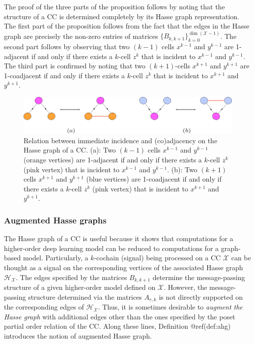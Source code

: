 \documentclass[
  12pt,
]{krantz}
\begin{document}
The proof of the three parts of the proposition follows by noting that
the structure of a CC is determined completely by its Hasse graph
representation. The first part of the proposition follows from the fact
that the edges in the Hasse graph are precisely the non-zero entries of
matrices \(\{B_{k,k+1}\}_{k=0}^{\dim(\mathcal{X}-1)}\). The second part
follows by observing that two \((k-1)\) cells \(x^{k-1}\) and
\(y^{k-1}\) are 1-adjacent if and only if there exists a \(k\)-cell
\(z^k\) that is incident to \(x^{k-1}\) and \(y^{k-1}\). The third part
is confirmed by noting that two \((k+1)\)-cells \(x^{k+1}\) and
\(y^{k+1}\) are 1-coadjacent if and only if there exists a \(k\)-cell
\(z^k\) that is incident to \(x^{k+1}\) and \(y^{k+1}\).

\begin{figure}

{\centering \includegraphics{figures/prop_structure} 

}

\caption{Relation between immediate incidence and (co)adjacency on the Hasse graph of a CC. (a): Two $(k-1)$ cells $x^{k-1}$ and $y^{k-1}$ (orange vertices) are 1-adjacent if and only if there exists a $k$-cell $z^k$ (pink vertex) that is incident to $x^{k-1}$ and $y^{k-1}$. (b): Two $(k+1)$ cells $x^{k+1}$ and $y^{k+1}$ (blue vertices) are 1-coadjacent if and only if there exists a $k$-cell $z^k$ (pink vertex) that is incident to $x^{k+1}$ and $y^{k+1}$.}\label{fig:vis-structure}
\end{figure}

\subsubsection{Augmented Hasse graphs}\label{augmented-hasse-graphs}

The Hasse graph of a CC is useful because it shows that computations for
a higher-order deep learning model can be reduced to computations for a
graph-based model. Particularly, a \(k\)-cochain (signal) being
processed on a CC \(\mathcal{X}\) can be thought as a signal on the
corresponding vertices of the associated Hasse graph
\(\mathcal{H}_{\mathcal{X}}\). The edges specified by the matrices
\(B_{k,k+1}\) determine the message-passing structure of a given
higher-order model defined on \(\mathcal{X}\). However, the
message-passing structure determined via the matrices \(A_{r,k}\) is not
directly supported on the corresponding edges of
\(\mathcal{H}_{\mathcal{X}}\). Thus, it is sometimes desirable to
\emph{augment the Hasse graph} with additional edges other than the ones
specified by the poset partial order relation of the CC. Along these
lines, Definition @ref(def:ahg) introduces the notion of augmented Hasse
graph.
\end{document}
